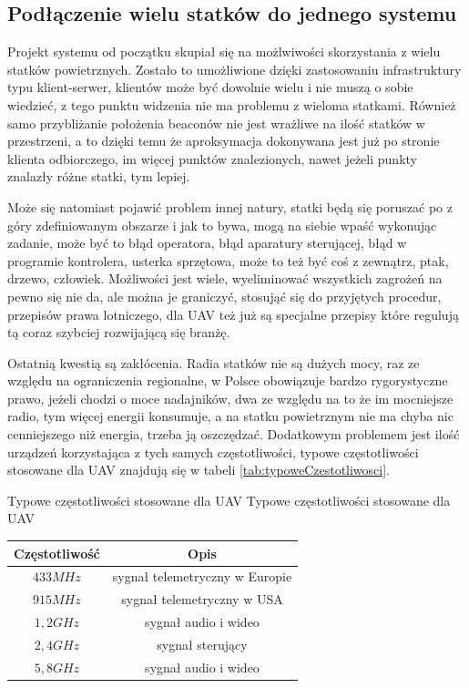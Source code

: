 \subsection{Podłączenie wielu statków do jednego systemu}
Projekt systemu od początku skupiał się na możlwiwości skorzystania z wielu statków powietrznych. Zostało to umożliwione dzięki zastosowaniu infrastruktury typu klient-serwer, klientów może być dowolnie wielu i nie muszą o sobie wiedzieć, z tego punktu widzenia nie ma problemu z wieloma statkami. Również samo przybliżanie położenia beaconów nie jest wrażliwe na ilość statków w przestrzeni, a to dzięki temu że aproksymacja dokonywana jest już po stronie klienta odbiorczego, im więcej punktów znalezionych, nawet jeżeli punkty znalazły różne statki, tym lepiej.

Może się natomiast pojawić problem innej natury, statki będą się poruszać po z góry zdefiniowanym obszarze i jak to bywa, mogą na siebie wpaść wykonując zadanie, może być to błąd operatora, błąd aparatury sterującej, błąd w programie kontrolera, usterka sprzętowa, może to też być coś z zewnątrz, ptak, drzewo, człowiek. Możliwości jest wiele, wyeliminować wszystkich zagrożeń na pewno się nie da, ale można je graniczyć, stosująć się do przyjętych procedur, przepisów prawa lotniczego, dla UAV też już są specjalne przepisy które regulują tą coraz szybciej rozwijającą się branżę.

Ostatnią kwestią są zakłócenia. Radia statków nie są dużych mocy, raz ze względu na ograniczenia regionalne, w Polsce obowiązuje bardzo rygorystyczne prawo, jeżeli chodzi o moce nadajników, dwa ze względu na to że im mocniejsze radio, tym więcej energii konsumuje, a na statku powietrznym nie ma chyba nic cenniejszego niż energia, trzeba ją oszczędzać. Dodatkowym problemem jest ilość urządzeń korzystająca z tych samych częstotliwości, typowe częstotliwości stosowane dla UAV znajdują się w tabeli \ref{tab:typoweCzestotliwosci}.
\begin{tablica}
    {Typowe częstotliwości stosowane dla UAV}
    {Typowe częstotliwości stosowane dla UAV}
    {
    \begin{tabular}{|c|c|} \hline
        Częstotliwość & Opis \\ \hline
        $433 MHz$  & sygnał telemetryczny w Europie \\ \hline
        $915 MHz$  & sygnał telemetryczny w USA \\ \hline
        $1,2 GHz$  & sygnał audio i wideo \\ \hline
        $2,4 GHz$  & sygnał sterujący \\ \hline
        $5,8 GHz$  & sygnał audio i wideo \\ \hline
   \end{tabular}
    }
    \label{tab:typoweCzestotliwosci}
\end{tablica}

